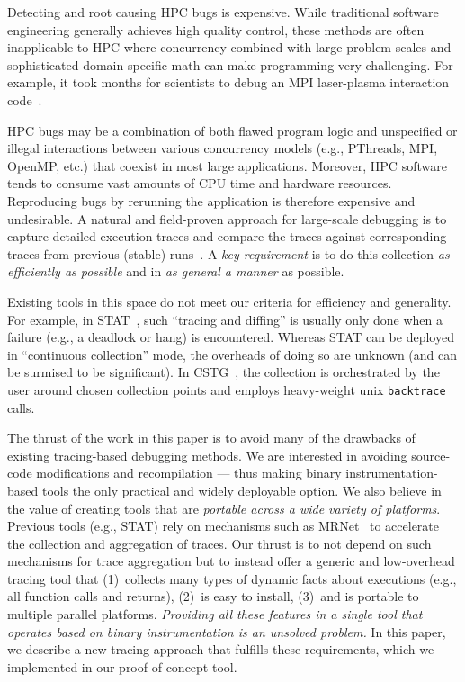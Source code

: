 Detecting and root causing HPC bugs is expensive. While traditional software engineering generally achieves high quality control, these methods are often inapplicable to HPC where concurrency combined with large problem scales and sophisticated domain-specific math can make programming very challenging. For example, it took months for scientists to debug an MPI laser-plasma interaction code~\cite{hpcdoe}.

HPC bugs may be a combination of both flawed program logic and unspecified or illegal interactions between various concurrency models (e.g., PThreads, MPI, OpenMP, etc.) that coexist in most large applications. Moreover, HPC software tends to consume vast amounts of CPU time and hardware resources. Reproducing bugs by rerunning the application is therefore expensive and undesirable. 
A natural and field-proven approach for large-scale debugging is to capture detailed execution traces and compare the traces against corresponding traces from previous (stable) runs~\cite{stat,cstg}.
%
A {\em key requirement} is to do this collection {\em as efficiently as possible}
and in {\em as general a manner} as possible.
%

Existing tools in this space
do not meet our criteria for efficiency and generality.
%
For example, in STAT~\cite{stat}, such ``tracing and diffing'' is usually only done
when a failure (e.g., a deadlock or hang) is encountered.
%
Whereas STAT can be deployed in ``continuous collection'' mode, the overheads of
doing so are unknown (and can be surmised to be significant).
%
In CSTG~\cite{cstg}, the collection is orchestrated by the
user around chosen collection points and employs heavy-weight
unix {\tt backtrace} calls.


The thrust of the work in this paper is to avoid many of the drawbacks of existing
tracing-based debugging methods.
%
We are interested in avoiding
source-code modifications and recompilation --- thus making binary
instrumentation-based tools the only practical and widely deployable option.
%
We also believe in the value
of creating tools that are {\em portable across a 
wide variety of platforms}.
%
Previous tools (e.g., STAT) rely on mechanisms such as
MRNet~\cite{mrnet} to accelerate the collection and aggregation of traces.
%
Our thrust is to not depend on such mechanisms for trace aggregation but to instead offer 
a generic and low-overhead tracing tool that 
(1)~collects many types of dynamic facts about executions (e.g., all function
calls and returns), 
(2)~is easy to install, 
(3)~and is portable to multiple parallel platforms.
%
{\em Providing all these features in a single tool
that operates based on binary instrumentation
is an unsolved problem.}
%
In this paper, we describe a new tracing approach that fulfills these requirements, which we implemented in our proof-of-concept \parlot tool.


